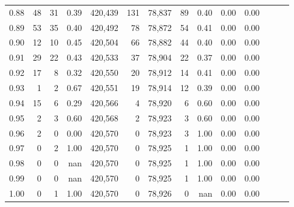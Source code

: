 \begin{tabular}{rrrrrrrrrrrrrr}
0.88 &      48 &     31 &  0.39 &  420,439 &      131 &  78,837 &      89 &  0.40 &  0.00 &      0.00 \\
0.89 &      53 &     35 &  0.40 &  420,492 &       78 &  78,872 &      54 &  0.41 &  0.00 &      0.00 \\
0.90 &      12 &     10 &  0.45 &  420,504 &       66 &  78,882 &      44 &  0.40 &  0.00 &      0.00 \\
0.91 &      29 &     22 &  0.43 &  420,533 &       37 &  78,904 &      22 &  0.37 &  0.00 &      0.00 \\
0.92 &      17 &      8 &  0.32 &  420,550 &       20 &  78,912 &      14 &  0.41 &  0.00 &      0.00 \\
0.93 &       1 &      2 &  0.67 &  420,551 &       19 &  78,914 &      12 &  0.39 &  0.00 &      0.00 \\
0.94 &      15 &      6 &  0.29 &  420,566 &        4 &  78,920 &       6 &  0.60 &  0.00 &      0.00 \\
0.95 &       2 &      3 &  0.60 &  420,568 &        2 &  78,923 &       3 &  0.60 &  0.00 &      0.00 \\
0.96 &       2 &      0 &  0.00 &  420,570 &        0 &  78,923 &       3 &  1.00 &  0.00 &      0.00 \\
0.97 &       0 &      2 &  1.00 &  420,570 &        0 &  78,925 &       1 &  1.00 &  0.00 &      0.00 \\
0.98 &       0 &      0 &   nan &  420,570 &        0 &  78,925 &       1 &  1.00 &  0.00 &      0.00 \\
0.99 &       0 &      0 &   nan &  420,570 &        0 &  78,925 &       1 &  1.00 &  0.00 &      0.00 \\
1.00 &       0 &      1 &  1.00 &  420,570 &        0 &  78,926 &       0 &   nan &  0.00 &      0.00 \\
\bottomrule
\end{tabular}
